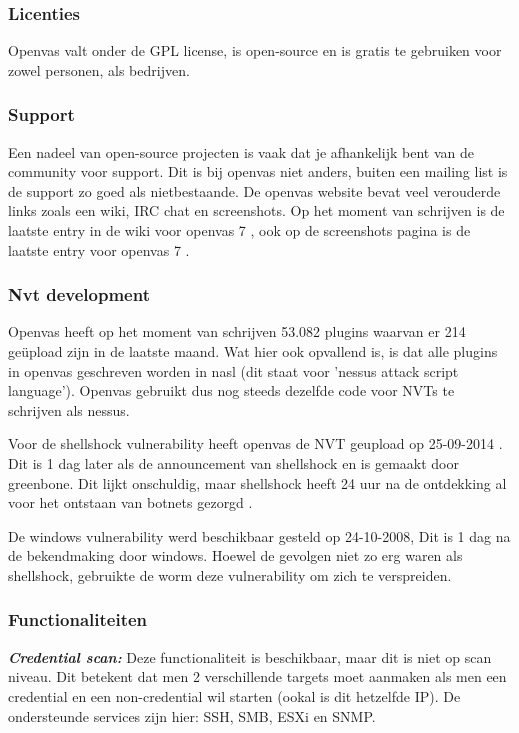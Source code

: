 \subsubsection{Licenties}

Openvas valt onder de GPL license, is open-source en is gratis te gebruiken voor zowel personen, als bedrijven.

\subsubsection{Support}
Een nadeel van open-source projecten is vaak dat je afhankelijk bent van de community voor support. Dit is bij openvas niet anders, buiten een mailing list is de support zo goed als nietbestaande. De openvas website bevat veel verouderde links zoals een wiki, IRC chat en screenshots. Op het moment van schrijven is de laatste entry in de wiki voor openvas 7 \textcite{Openvas-wiki}, ook op de screenshots pagina is de laatste entry voor openvas 7 \textcite{Openvas-screenshots}.

\subsubsection{Nvt development}
Openvas heeft op het moment van schrijven 53.082 plugins \textcite{Openvas-nvt} waarvan er 214 geüpload zijn in de laatste maand. Wat hier ook opvallend is, is dat alle plugins in openvas geschreven worden in nasl (dit staat voor 'nessus attack script language'). Openvas gebruikt dus nog steeds dezelfde code voor NVTs te schrijven als nessus. 

Voor de shellshock vulnerability heeft openvas de NVT geupload op 25-09-2014 \textcite{Vulners-shellshock-openvas}. Dit is 1 dag later als de announcement van shellshock en is gemaakt door greenbone. Dit lijkt onschuldig, maar shellshock heeft 24 uur na de ontdekking al voor het ontstaan van botnets gezorgd \textcite{wired-shellshock}. 

De windows vulnerability werd beschikbaar gesteld op 24-10-2008, Dit is 1 dag na de bekendmaking door windows. Hoewel de gevolgen niet zo erg waren als shellshock, gebruikte de worm \textcite{Microsoft} deze vulnerability om zich te verspreiden.

\subsubsection{Functionaliteiten}
\textbf{\textit{Credential scan: }} Deze functionaliteit is beschikbaar, maar dit is niet op scan niveau. Dit betekent dat men 2 verschillende targets moet aanmaken als men een credential en een non-credential wil starten (ookal is dit hetzelfde IP). De ondersteunde services zijn hier: SSH, SMB, ESXi en SNMP.

